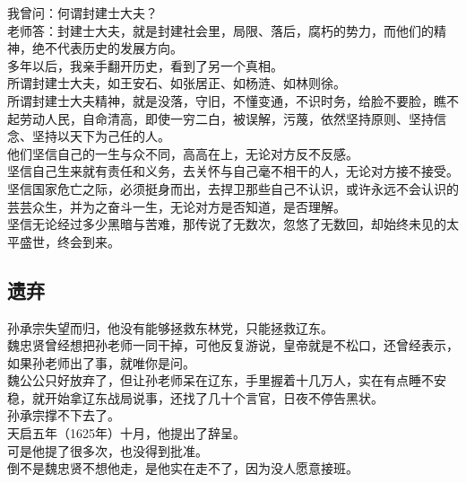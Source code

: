 \begin{multicols}{\theparacolNo}
我曾问：何谓封建士大夫？\\

老师答：封建士大夫，就是封建社会里，局限、落后，腐朽的势力，而他们的精神，绝不代表历史的发展方向。\\

多年以后，我亲手翻开历史，看到了另一个真相。\\

所谓封建士大夫，如王安石、如张居正、如杨涟、如林则徐。\\

所谓封建士大夫精神，就是没落，守旧，不懂变通，不识时务，给脸不要脸，瞧不起劳动人民，自命清高，即使一穷二白，被误解，污蔑，依然坚持原则、坚持信念、坚持以天下为己任的人。\\

他们坚信自己的一生与众不同，高高在上，无论对方反不反感。\\

坚信自己生来就有责任和义务，去关怀与自己毫不相干的人，无论对方接不接受。\\

坚信国家危亡之际，必须挺身而出，去捍卫那些自己不认识，或许永远不会认识的芸芸众生，并为之奋斗一生，无论对方是否知道，是否理解。\\

坚信无论经过多少黑暗与苦难，那传说了无数次，忽悠了无数回，却始终未见的太平盛世，终会到来。\\

\subsection{遗弃}
孙承宗失望而归，他没有能够拯救东林党，只能拯救辽东。\\

魏忠贤曾经想把孙老师一同干掉，可他反复游说，皇帝就是不松口，还曾经表示，如果孙老师出了事，就唯你是问。\\

魏公公只好放弃了，但让孙老师呆在辽东，手里握着十几万人，实在有点睡不安稳，就开始拿辽东战局说事，还找了几十个言官，日夜不停告黑状。\\

孙承宗撑不下去了。\\

天启五年（1625年）十月，他提出了辞呈。\\

可是他提了很多次，也没得到批准。\\

倒不是魏忠贤不想他走，是他实在走不了，因为没人愿意接班。\\


\end{multicols}
